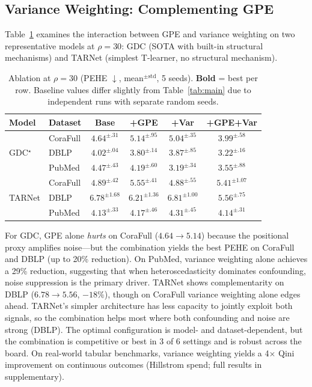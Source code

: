 \documentclass[sigconf,anonymous,review]{acmart}
\begin{document}
\subsection{Variance Weighting: Complementing GPE}\label{sec:var_exp}

Table~\ref{tab:var} examines the interaction between GPE and variance weighting on two representative models at $\rho=30$: GDC (SOTA with built-in structural mechanisms) and TARNet (simplest T-learner, no structural mechanism).

\begin{table}[t]
\caption{Ablation at $\rho=30$ (PEHE $\downarrow$, mean$^{\pm\text{std}}$, 5 seeds). \textbf{Bold} = best per row. Baseline values differ slightly from Table~\ref{tab:main} due to independent runs with separate random seeds.}
\label{tab:var}
\centering
\footnotesize
\setlength{\tabcolsep}{2.5pt}
\begin{tabular}{@{}llcccc@{}}
\toprule
Model & Dataset & Base & +GPE & +Var & +GPE+Var \\
\midrule
\multirow{3}{*}{GDC$^\star$} & CoraFull & $4.64^{\pm.31}$ & $5.14^{\pm.95}$ & $5.04^{\pm.35}$ & $\mathbf{3.99}^{\pm.58}$ \\
& DBLP & $4.02^{\pm.04}$ & $3.80^{\pm.14}$ & $3.87^{\pm.85}$ & $\mathbf{3.22}^{\pm.16}$ \\
& PubMed & $4.47^{\pm.43}$ & $4.19^{\pm.60}$ & $\mathbf{3.19}^{\pm.34}$ & $3.55^{\pm.88}$ \\
\midrule
\multirow{3}{*}{TARNet} & CoraFull & $4.89^{\pm.42}$ & $5.55^{\pm.41}$ & $\mathbf{4.88}^{\pm.55}$ & $5.41^{\pm1.07}$ \\
& DBLP & $6.78^{\pm1.68}$ & $6.21^{\pm1.36}$ & $6.81^{\pm1.00}$ & $\mathbf{5.56}^{\pm.75}$ \\
& PubMed & $\mathbf{4.13}^{\pm.33}$ & $4.17^{\pm.46}$ & $4.31^{\pm.45}$ & $4.14^{\pm.31}$ \\
\bottomrule
\end{tabular}
\end{table}

For GDC, GPE alone \emph{hurts} on CoraFull ($4.64 \to 5.14$) because the positional proxy amplifies noise---but the combination yields the best PEHE on CoraFull and DBLP (up to 20\% reduction). On PubMed, variance weighting alone achieves a 29\% reduction, suggesting that when heteroscedasticity dominates confounding, noise suppression is the primary driver. TARNet shows complementarity on DBLP ($6.78 \to 5.56$, $-18\%$), though on CoraFull variance weighting alone edges ahead. TARNet's simpler architecture has less capacity to jointly exploit both signals, so the combination helps most where both confounding and noise are strong (DBLP). The optimal configuration is model- and dataset-dependent, but the combination is competitive or best in 3 of 6 settings and is robust across the board. On real-world tabular benchmarks, variance weighting yields a 4$\times$ Qini improvement on continuous outcomes (Hillstrom spend; full results in supplementary).
\end{document}

